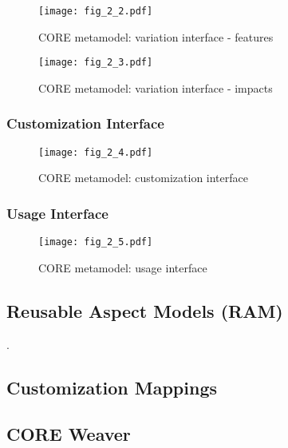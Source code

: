 \begin{figure}
	\centering
	\texttt{[image: fig\_2\_2.pdf]}
	\caption{CORE metamodel: variation interface - features}
	\label{fig:2.2}
\end{figure}

\begin{figure}
	\centering
	\texttt{[image: fig\_2\_3.pdf]}
	\caption{CORE metamodel: variation interface - impacts}
	\label{fig:2.3}
\end{figure}

\subsubsection{Customization Interface}

\begin{figure}
	\centering
	\texttt{[image: fig\_2\_4.pdf]}
	\caption{CORE metamodel: customization interface}
	\label{fig:2.4}
\end{figure}

\subsubsection{Usage Interface}

\begin{figure}
	\centering
	\texttt{[image: fig\_2\_5.pdf]}
	\caption{CORE metamodel: usage interface}
	\label{fig:2.5}
\end{figure}

\subsection{Reusable Aspect Models (RAM)}

.

\subsection{Customization Mappings}

\subsection{CORE Weaver}

